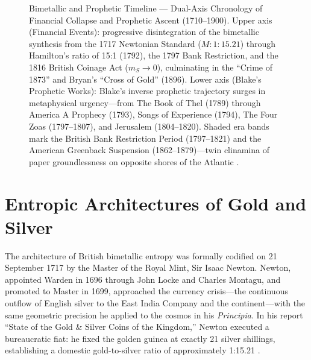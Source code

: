 \documentclass[
]{article}
\makeatletter
\newcommand*\pandocbounded[1]{%
  \sbox\pandoc@box{#1}%
  \Gscale@div\@tempa{\textheight}{\dimexpr\ht\pandoc@box+\dp\pandoc@box\relax}%
  \Gscale@div\@tempb{\linewidth}{\wd\pandoc@box}%
  \ifdim\@tempb\p@<\@tempa\p@\let\@tempa\@tempb\fi%
  \ifdim\@tempa\p@<\p@\scalebox{\@tempa}{\usebox\pandoc@box}%
  \else\usebox{\pandoc@box}%
  \fi%
}
\makeatother
\begin{document}
\begin{figure}
\centering
\pandocbounded{\includegraphics[keepaspectratio,alt={Bimetallic and Prophetic Timeline --- Dual-Axis Chronology of Financial Collapse and Prophetic Ascent (1710--1900). Upper axis (Financial Events): progressive disintegration of the bimetallic synthesis from the 1717 Newtonian Standard (M: 1:15.21) through Hamilton's ratio of 15:1 (1792), the 1797 Bank Restriction, and the 1816 British Coinage Act (m\_S \textbackslash to 0), culminating in the ``Crime of 1873'' and Bryan's ``Cross of Gold'' (1896). Lower axis (Blake's Prophetic Works): Blake's inverse prophetic trajectory surges in metaphysical urgency---from The Book of Thel (1789) through America A Prophecy (1793), Songs of Experience (1794), The Four Zoas (1797--1807), and Jerusalem (1804--1820). Shaded era bands mark the British Bank Restriction Period (1797--1821) and the American Greenback Suspension (1862--1879)---twin clinamina of paper groundlessness on opposite shores of the Atlantic {[}@fetter1965development; @laughlin1898bimetallism{]}.}]{../figures/timeline.png}}
\caption{Bimetallic and Prophetic Timeline --- Dual-Axis Chronology of
Financial Collapse and Prophetic Ascent (1710--1900). Upper axis
(Financial Events): progressive disintegration of the bimetallic
synthesis from the 1717 Newtonian Standard (\(M: 1:15.21\)) through
Hamilton's ratio of 15:1 (1792), the 1797 Bank Restriction, and the 1816
British Coinage Act (\(m_S \to 0\)), culminating in the ``Crime of
1873'' and Bryan's ``Cross of Gold'' (1896). Lower axis (Blake's
Prophetic Works): Blake's inverse prophetic trajectory surges in
metaphysical urgency---from The Book of Thel (1789) through America A
Prophecy (1793), Songs of Experience (1794), The Four Zoas (1797--1807),
and Jerusalem (1804--1820). Shaded era bands mark the British Bank
Restriction Period (1797--1821) and the American Greenback Suspension
(1862--1879)---twin clinamina of paper groundlessness on opposite shores
of the Atlantic
\citep{fetter1965development, laughlin1898bimetallism}.}\label{fig-timeline}
\end{figure}

\newpage

\section{Entropic Architectures of Gold and
Silver}\label{entropic-architectures-of-gold-and-silver}

The architecture of British bimetallic entropy was formally codified on
21 September 1717 by the Master of the Royal Mint, Sir Isaac Newton.
Newton, appointed Warden in 1696 through John Locke and Charles Montagu,
and promoted to Master in 1699, approached the currency crisis---the
continuous outflow of English silver to the East India Company and the
continent---with the same geometric precision he applied to the cosmos
in his \emph{Principia}. In his report ``State of the Gold \& Silver
Coins of the Kingdom,'' Newton executed a bureaucratic fiat: he fixed
the golden guinea at exactly 21 silver shillings, establishing a
domestic gold-to-silver ratio of approximately 1:15.21
\citep{quinn1996competing}.
\end{document}
